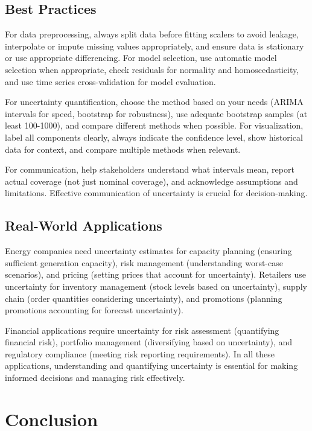 \subsection{Best Practices}

For data preprocessing, always split data before fitting scalers to avoid leakage, interpolate or impute missing values appropriately, and ensure data is stationary or use appropriate differencing. For model selection, use automatic model selection when appropriate, check residuals for normality and homoscedasticity, and use time series cross-validation for model evaluation.

For uncertainty quantification, choose the method based on your needs (ARIMA intervals for speed, bootstrap for robustness), use adequate bootstrap samples (at least 100-1000), and compare different methods when possible. For visualization, label all components clearly, always indicate the confidence level, show historical data for context, and compare multiple methods when relevant.

For communication, help stakeholders understand what intervals mean, report actual coverage (not just nominal coverage), and acknowledge assumptions and limitations. Effective communication of uncertainty is crucial for decision-making.

\subsection{Real-World Applications}

Energy companies need uncertainty estimates for capacity planning (ensuring sufficient generation capacity), risk management (understanding worst-case scenarios), and pricing (setting prices that account for uncertainty). Retailers use uncertainty for inventory management (stock levels based on uncertainty), supply chain (order quantities considering uncertainty), and promotions (planning promotions accounting for forecast uncertainty).

Financial applications require uncertainty for risk assessment (quantifying financial risk), portfolio management (diversifying based on uncertainty), and regulatory compliance (meeting risk reporting requirements). In all these applications, understanding and quantifying uncertainty is essential for making informed decisions and managing risk effectively.



\section{Conclusion}


